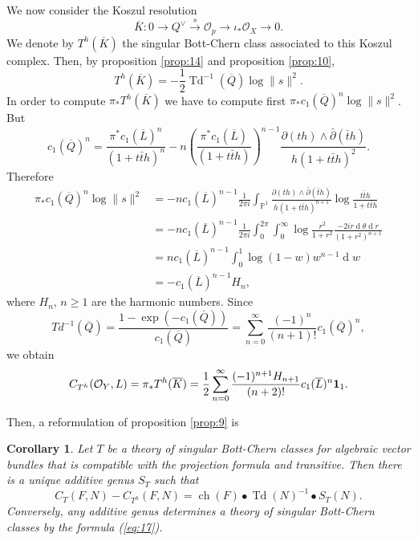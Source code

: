 \documentclass[10pt,twoside]{article}
\numberwithin{equation}{section}
\theoremstyle{plain}
\newtheorem{corollary}[equation]{Corollary}
\theoremstyle{definition}
\DeclareMathOperator{\Td}{Td}
\DeclareMathOperator{\dd}{d}
\DeclareMathOperator{\ch}{ch}
\begin{document}
We now consider the Koszul resolution
\begin{displaymath}
  \overline K\colon  0\longrightarrow Q^{\vee}\overset{s}{\longrightarrow}
  \mathcal{O}_{p} \longrightarrow \iota_{\ast}\mathcal{O}_{X}
  \longrightarrow 0.
\end{displaymath}
 We denote by $T^{h}(\overline K)$ the singular Bott-Chern class
 associated to this Koszul complex. Then, by proposition \ref{prop:14}
 and proposition \ref{prop:10},
 \begin{displaymath}
   T^{h}(\overline K)=-\frac{1}{2}\Td^{-1}(\overline
   Q)\log\|s\|^{2}. 
 \end{displaymath}
 In order to compute $\pi _{\ast}T^{h}(\overline K)$ we have to
 compute first $\pi _{\ast}c_{1}(\overline Q)^{n}\log\|s\|^{2}$.
 But
 \begin{displaymath}
   c_{1}(\overline Q)^{n}=
   \frac{\pi^{\ast}c_{1}(\overline L)^{n}}{(1+t\bar t h)^{n}}-
   n\left(\frac{\pi^{\ast}c_{1}(\overline L)}{(1+t\bar t h)}
   \right)^{n-1}\frac{\partial (t h)\land \bar \partial(\bar t
     h)}{h(1+t\bar t h)^{2}}.
 \end{displaymath}
Therefore 
 \begin{align*}
   \pi _{\ast}c_{1}(\overline
   Q)^{n}\log\|s\|^{2}&=-nc_{1}(\overline L)^{n-1} 
   \frac{1}{2\pi i}\int_{\mathbb{P}^{1}}\frac{\partial (t h)\land
     \bar \partial(\bar t 
     h)}{h(1+t\bar t h)^{n+1}}\log \frac{t\bar t h}{1+t\bar t h}\\
   &=-n c_{1}(\overline L)^{n-1} 
   \frac{1}{2\pi i}\int_{0}^{2\pi}\int _{0}^{\infty}
   \log \frac{r^{2}}{1+r^{2}}\frac{-2ir\dd \theta \dd
     r}{(1+r^{2})^{n+1}}\\ 
   &=n c_{1}(\overline
   L)^{n-1}\int_{0}^{1}\log(1-w)w^{n-1}\dd w\\
   &=-c_{1}(\overline
   L)^{n-1} H_{n},
 \end{align*}
 where $H_{n}$, $n\ge 1$ are the harmonic numbers. 
 Since
 \begin{displaymath}
   Td^{-1}(\overline Q)=\frac{1-\exp(-c_{1}(\overline
     Q))}{c_{1}(\overline
     Q)}=\sum_{n=0}^{\infty}\frac{(-1)^{n}}{(n+1)!}
   c_{1}(\overline Q)^{n},
 \end{displaymath}
we obtain
\begin{align*}
  C_{T^{h}}(\mathcal{O}_{Y},L)=\pi _{\ast}T^{h}(\overline
  K)=\frac{1}{2}\sum_{n=0}^{\infty} 
  \frac{(-1)^{n+1}H_{n+1}}{(n+2)!}c_{1}(\overline L)^{n}{\bf 1}_{1}.
\end{align*}

Then, a reformulation of proposition \ref{prop:9} is
\begin{corollary} \label{cor:10}
  Let $T$ be a theory of singular Bott-Chern classes for algebraic
  vector bundles that is
  compatible with the projection formula and transitive. Then there is
  a unique additive genus $S_{T}$ such that
  \begin{equation}\label{eq:17}
    C_{T}(F,N)-C_{T^{h}}(F,N)=\ch(F)\bullet \Td(N)^{-1}\bullet S_{T}(N).
  \end{equation}
  Conversely, any additive genus determines a theory of singular
  Bott-Chern classes by the formula (\ref{eq:17}).
\end{corollary}
\end{document}
